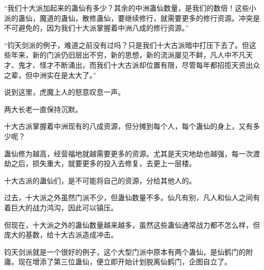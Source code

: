 \begin{this_body}
“我们十大派加起来的蛊仙有多少？其余的中洲蛊仙数量，是我们的数倍！这些小派的蛊仙，魔道的蛊仙，散修蛊仙，要继续修行，就需要更多的修行资源。冲突是不可避免的，因为我们十大派掌握着中洲八成的修行资源。”

“钧天剑派的例子，难道之前没有过吗？只是我们十大古派暗中打压下去了。但这些年来，新的门派仍旧层出不穷，新的思想，新的流派屡见不鲜，凡人中不凡天才、鬼才、怪才不断涌出，而我们十大古派却位置有限，尽管每年都招揽天资出众之辈，但中洲实在是太大了。”

说到这里，虎魔上人的怒意叹息一声。

两大长老一直保持沉默。

十大古派掌握着中洲现有的八成资源，但分摊到每个人，每个蛊仙的身上，又有多少呢？

蛊仙修为越高，经营福地就越需要更多的资源。尤其是天灾地劫也越强，每一次渡劫之后，损失重大，就要更多的投入去修复，去更上一层楼。

十大古派的蛊仙们，是不可能将自己的资源，分给其他人的。

过去，十大派之外虽然门派不少，但蛊仙数量不多。仙凡有别，凡人和仙人之间有着巨大的战力鸿沟，因此可以镇压。

但现在，十大派之外的蛊仙数量越来越多，虽然这些蛊仙通常战力都不怎么样，但庞大的基数，给十大古派造成冲击。

钧天剑派就是一个很好的例子，这个大型门派中原本有两个蛊仙，是仙鹤门的附庸。现在增添了第三位蛊仙，便立即开始计划脱离仙鹤门，企图自立了。

\end{this_body}

